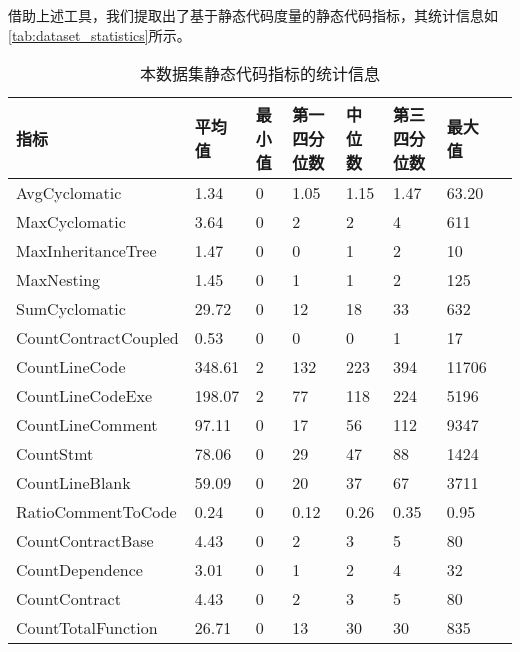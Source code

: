 借助上述工具，我们提取出了基于静态代码度量的静态代码指标，其统计信息如\autoref{tab:dataset_statistics}所示。
\begin{table}[htbp]
    \caption{\label{tab:dataset_statistics}本数据集静态代码指标的统计信息}
    \small
    \renewcommand{\arraystretch}{1.3}
    \begin{tabularx}{\linewidth}
        {p{3cm}<{\centering}X<{\centering}p{1.5cm}<{\centering}X<{\centering}X<{\centering}X<{\centering}X<{\centering}X<{\centering}}
    \hline
    \textbf{指标}                    & \textbf{平均值}   & \textbf{最小值} & \textbf{第一四分位数} & \textbf{中位数}  & \textbf{第三四分位数} & \textbf{最大值}   \\ \hline
    AvgCyclomatic         & 1.34        & 0   & 1.05   & 1.15 & 1.47   & 63.20 \\
    MaxCyclomatic         & 3.64        & 0   & 2      & 2    & 4      & 611   \\
    MaxInheritanceTree    & 1.47        & 0   & 0      & 1    & 2      & 10    \\
    MaxNesting            & 1.45        & 0   & 1      & 1    & 2      & 125   \\
    SumCyclomatic         & 29.72      & 0   & 12     & 18   & 33     & 632   \\
    CountContractCoupled  & 0.53        & 0   & 0      & 0    & 1      & 17    \\ \hline
    CountLineCode         & 348.61    & 2   & 132    & 223  & 394    & 11706 \\
    CountLineCodeExe      & 198.07    & 2   & 77     & 118  & 224    & 5196  \\
    CountLineComment      & 97.11     & 0   & 17     & 56   & 112    & 9347  \\
    CountStmt             & 78.06      & 0   & 29     & 47   & 88     & 1424  \\
    CountLineBlank        & 59.09      & 0   & 20     & 37   & 67     & 3711  \\
    RatioCommentToCode    & 0.24        & 0   & 0.12   & 0.26 & 0.35   & 0.95  \\ \hline
    CountContractBase     & 4.43        & 0   & 2      & 3    & 5      & 80    \\
    CountDependence       & 3.01        & 0   & 1      & 2    & 4      & 32    \\
    CountContract         & 4.43        & 0   & 2      & 3    & 5      & 80    \\
    CountTotalFunction    & 26.71      & 0   & 13     & 30   & 30     & 835   \\

\end{tabularx}
\end{table}
